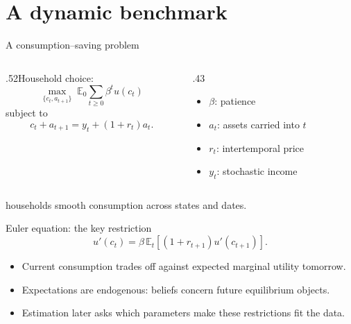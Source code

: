\documentclass[aspectratio=169,10pt]{beamer}
\begin{document}
\section{A dynamic benchmark}
\begin{frame}{A consumption--saving problem}
\begin{columns}[T]\begin{column}{.52\textwidth}Household choice:
\[\max_{\{c_t,a_{t+1}\}}\; \mathbb E_0\sum_{t\geq0}\beta^t u(c_t)\]
subject to \[c_t+a_{t+1}=y_t+(1+r_t)a_t.\]
\end{column}\begin{column}{.43\textwidth}\begin{itemize}\item \(\beta\): patience\item \(a_t\): assets carried into \(t\)\item \(r_t\): intertemporal price\item \(y_t\): stochastic income\end{itemize}\end{column}\end{columns}
\vfill{} households smooth consumption across states and dates.\end{frame}
\begin{frame}{Euler equation: the key restriction}
\[u'(c_t)=\beta\,\mathbb E_t\left[(1+r_{t+1})u'(c_{t+1})\right].\]
\begin{itemize}\item Current consumption trades off against expected marginal utility tomorrow.\item Expectations are endogenous: beliefs concern future equilibrium objects.\item Estimation later asks which parameters make these restrictions fit the data.\end{itemize}
\end{frame}
\end{document}
